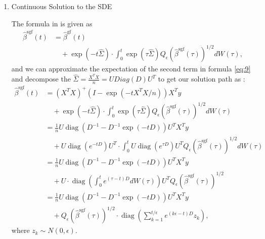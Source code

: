 \documentclass[11pt]{article}
\begin{document}
    \begin{enumerate}
        \item Continuous Solution to the SDE
        
        The formula in  \cite {ali2020implicit} is given as
        \begin{equation}
        \label{eq:9}
            \begin{aligned}
            \hat{\beta}^{\operatorname{sgf}}(t)&=\hat{\beta}^{\operatorname{gf}}(t) \\
            &\quad+\exp (-t \hat{\Sigma}) \cdot \int_{0}^{t} \exp (\tau \hat{\Sigma}) Q_{\epsilon}\left(\hat{\beta}^{\operatorname{sgf}}(\tau)\right)^{1 / 2} d W(\tau) ,
            \end{aligned}
        \end{equation}
        and we can approximate the expectation of the second term in formula \ref{eq:9} and decompose the $\hat{\Sigma}=\frac{X^TX}{n}=U Diag(D) U^T$ to get our solution path as :
        \begin{equation}
        \label{eq:10}
            \begin{aligned}
            \hat{\beta}^{\operatorname{sgf}}(t)&=\left(X^{T} X\right)^{+}\left(I-\exp \left(-t X^{T} X / n\right)\right) X^{T} y  \\
            &\quad+\exp (-t \hat{\Sigma}) \cdot \int_{0}^{t} \exp (\tau \hat{\Sigma}) Q_{\epsilon}\left(\hat{\beta}^{\operatorname{sgf}}(\tau)\right)^{1 / 2} d W(\tau) \\
            &=\frac{1}{n} U \operatorname{diag}\left(D^{-1}-D^{-1} \exp (-t D)\right) U^{T} X^{T} y \\
            &\quad+U \operatorname{diag}\left(e^{-t D}\right) U^{T} \cdot \int_{0}^{t} U \operatorname{diag}\left(e^{\tau D}\right) U^{T} Q_{\epsilon}\left(\hat{\beta}^{\operatorname{sgf}}(\tau)\right)^{1 / 2} d W(\tau) \\
            &=\frac{1}{n} U \operatorname{diag}\left(D^{-1}-D^{-1} \exp (-t D)\right) U^{T} X^{T} y \\
            &\quad+U  \cdot \operatorname{diag}\left( \int_{0}^{t}  e^{(\tau-t) D} d W(\tau)  \right) U^{T} Q_{\epsilon}\left(\hat{\beta}^{\operatorname{sgf}}(\tau)\right)^{1 / 2} \\
            &=\frac{1}{n} U \operatorname{diag}\left(D^{-1}-D^{-1} \exp (-t D)\right) U^{T} X^{T} y \\
            &\quad+Q_{\epsilon}\left(\hat{\beta}^{\operatorname{sgf}}(\tau)\right)^{1 / 2} 
            \cdot \operatorname{diag}\left( \sum_{k=1}^{t/\epsilon}  e^{(k\epsilon-t) D} z_k  \right) 
            ,
            \end{aligned}
        \end{equation}
        where $z_k \sim N(0,\epsilon)$.
        

\end{enumerate}
\end{document}
